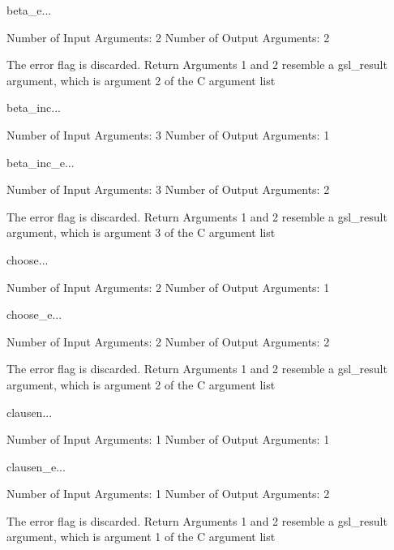 \begin{funcdesc}{beta_e}{...}

    Number of Input  Arguments:  2
    Number of Output Arguments:  2

The error flag is discarded.
Return Arguments 1 and 2 resemble a gsl_result argument,
	which is  argument 2 of the C argument list

\end{funcdesc}

\begin{funcdesc}{beta_inc}{...}

    Number of Input  Arguments:  3
    Number of Output Arguments:  1
\end{funcdesc}

\begin{funcdesc}{beta_inc_e}{...}

    Number of Input  Arguments:  3
    Number of Output Arguments:  2

The error flag is discarded.
Return Arguments 1 and 2 resemble a gsl_result argument,
	which is  argument 3 of the C argument list

\end{funcdesc}

\begin{funcdesc}{choose}{...}

    Number of Input  Arguments:  2
    Number of Output Arguments:  1
\end{funcdesc}

\begin{funcdesc}{choose_e}{...}

    Number of Input  Arguments:  2
    Number of Output Arguments:  2

The error flag is discarded.
Return Arguments 1 and 2 resemble a gsl_result argument,
	which is  argument 2 of the C argument list

\end{funcdesc}

\begin{funcdesc}{clausen}{...}

    Number of Input  Arguments:  1
    Number of Output Arguments:  1
\end{funcdesc}

\begin{funcdesc}{clausen_e}{...}

    Number of Input  Arguments:  1
    Number of Output Arguments:  2

The error flag is discarded.
Return Arguments 1 and 2 resemble a gsl_result argument,
	which is  argument 1 of the C argument list

\end{funcdesc}

